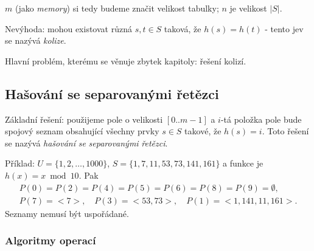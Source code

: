 \documentclass[a4paper,12pt]{article}
\begin{document}
$m$ (jako \emph{memory}) si tedy budeme značit velikost tabulky; $n$ je velikost $|S|$.

Nevýhoda: mohou existovat různá $s,t\in S$ taková, 
že $h(s)=h(t)$ - tento jev se nazývá \emph{kolize}.

Hlavní problém, kterému se věnuje zbytek kapitoly: řešení kolizí.

\subsection{Hašování se separovanými řetězci}
\label{sepretezce}

Základní řešení: použijeme pole o velikosti $[
0..m-1]$ a 
$i$-tá položka pole bude spojový seznam obsahující 
všechny prvky $s\in S$ takové, že $h(s)=i$. Toto řešení se 
nazývá \emph{hašování} \emph{se} \emph{separovanými} 
\emph{řetězci}.

Příklad: $U=\{1,2,\dots,1000\}$, $S=\{1,7,11,53,
73,141,161\}$ a 
funkce je $h(x)=x\bmod10$. Pak 
\begin{gather*} P(0)=P(2)=P(4)=P(5)=P(6)=P(8)=P(9)=\emptyset ,\\
P(7)=<7>,\quad P(3)=<53,73>,\quad P(1)=<1,141,11,161>.\end{gather*}
Seznamy nemusí být uspořádané.  

\subsubsection{Algoritmy operací}
\end{document}
